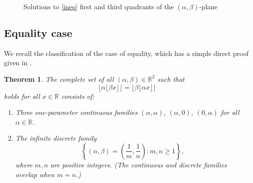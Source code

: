 \documentclass[12pt,letterpaper, reqno]{amsart}
\newtheorem{thm}{Theorem}[section]
\theoremstyle{definition}
\theoremstyle{remark}
\newcommand{\RR}{\ensuremath{\mathbb{R}}}
\begin{document}
\begin{figure}[h]
\begin{center}
\begin{tikzpicture}[scale=.6]
\end{tikzpicture}
\end{center}
\caption{Solutions to \eqref{ineq}   first and third quadrants of the $(\alpha,\beta)$-plane}
\end{figure} \label{fig1}



%
%
\subsection{Equality case}

We recall the classification of the case of equality,
which has a simple direct proof 
given in \cite{LMR16}.

%
%
\begin{thm} \label{thm:main-eq}
  The complete set of all $(\alpha, \beta) \in \RR^2$ such that
  \[
    \lfloor \alpha \lfloor \beta x\rfloor \rfloor
    = \lfloor \beta \lfloor \alpha x\rfloor \rfloor
  \]
  holds for all $x \in \RR$ consists of:
  \begin{enumerate}
    \item[(i)]
      Three one-parameter continuous families $(\alpha, \alpha)$, $(\alpha, 0)$, $(0, \alpha)$ for
      all $\alpha \in \RR$. 
    \item[(ii)]
      The infinite discrete family 
      \[
        \left\{ (\alpha, \beta) = \left(\frac{1}{m}, \frac{1}{n}\right) : m, n
        \ge 1 \right\},
      \]
      where $m,n$ are positive integers. (The continuous and discrete families overlap when $m=n$.) 
  \end{enumerate}
\end{thm}
\end{document}
